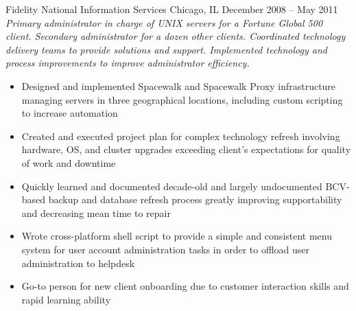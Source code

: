 \documentclass[9pt]{extarticle} %
\begin{document}
\begin{indented}
	Fidelity National Information Services \tab Chicago, IL \tab December 2008 -- May 2011\\
	\textit{Primary administrator in charge of UNIX servers for a Fortune Global 500 client. Secondary administrator for a dozen other clients. Coordinated technology delivery teams to provide solutions and support. Implemented technology and process improvements to improve administrator efficiency.}
	\begin{itemize}
		\item Designed and implemented Spacewalk and Spacewalk Proxy infrastructure managing servers in three geographical locations, including custom scripting to increase automation
		\item Created and executed project plan for complex technology refresh involving hardware, OS, and cluster upgrades exceeding client’s expectations for quality of work and downtime
		\item Quickly learned and documented decade-old and largely undocumented BCV-based backup and database refresh process greatly improving supportability and decreasing mean time to repair
		\item Wrote cross-platform shell script to provide a simple and consistent menu system for user account administration tasks in order to offload user administration to helpdesk
		\item Go-to person for new client onboarding due to customer interaction skills and rapid learning ability
	\end{itemize}
\end{indented}

\bigskip


\end{document}
